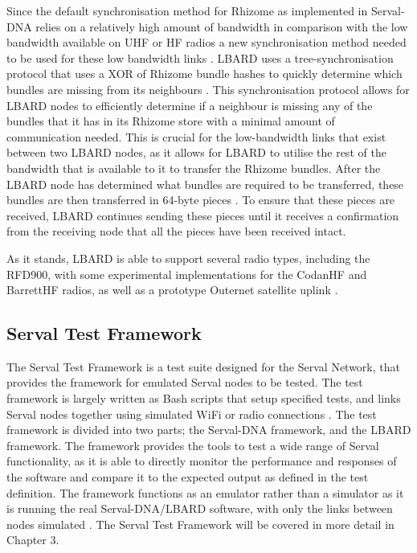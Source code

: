 Since the default synchronisation method for Rhizome as implemented in Serval-DNA relies on a relatively high amount of bandwidth in comparison with the low bandwidth available on UHF or HF radios a new synchronisation method needed to be used for these low bandwidth links \parencite{productizingServalMesh}.
LBARD uses a tree-synchronisation protocol that uses a XOR of Rhizome bundle hashes to quickly determine which bundles are missing from its neighbours \parencite{lbardDocumentation}.
This synchronisation protocol allows for LBARD nodes to efficiently determine if a neighbour is missing any of the bundles that it has in its Rhizome store with a minimal amount of communication needed.
This is crucial for the low-bandwidth links that exist between two LBARD nodes, as it allows for LBARD to utilise the rest of the bandwidth that is available to it to transfer the Rhizome bundles.
After the LBARD node has determined what bundles are required to be transferred, these bundles are then transferred in 64-byte pieces \parencite{lbardDocumentation}.
To ensure that these pieces are received, LBARD continues sending these pieces until it receives a confirmation from the receiving node that all the pieces have been received intact.

As it stands, LBARD is able to support several radio types, including the RFD900, with some experimental implementations for the CodanHF and BarrettHF radios, as well as a prototype Outernet satellite uplink \parencite{lbardDocumentation}.

\subsection{Serval Test Framework}
The Serval Test Framework is a test suite designed for the Serval Network, that provides the framework for emulated Serval nodes to be tested.
The test framework is largely written as Bash scripts that setup specified tests, and links Serval nodes together using simulated WiFi or radio connections \parencite{servalTestDocumentation}.
The test framework is divided into two parts; the Serval-DNA framework, and the LBARD framework.
The framework provides the tools to test a wide range of Serval functionality, as it is able to directly monitor the performance and responses of the software and compare it to the expected output as defined in the test definition.
The framework functions as an emulator rather than a simulator as it is running the real Serval-DNA/LBARD software, with only the links between nodes simulated \parencite{servalTestDocumentation}.
The Serval Test Framework will be covered in more detail in Chapter 3.

